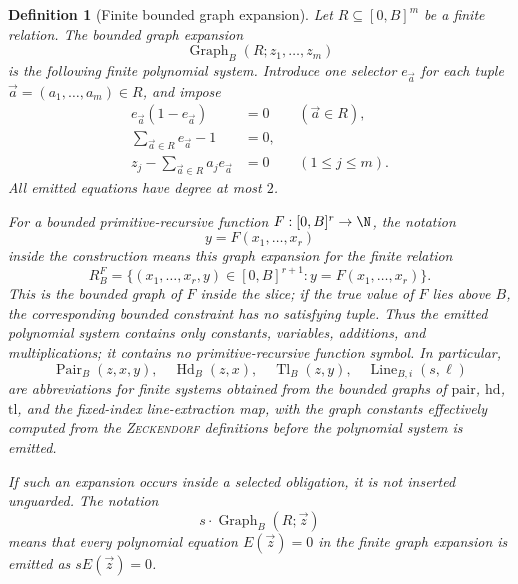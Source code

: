 \documentclass[letterpaper,10pt]{article}
\theoremstyle{upright}
\theoremstyle{upright}
\newtheorem{definition}[theorem]{Definition}
\begin{document}
\begin{definition}[Finite bounded graph expansion]
\label{def:bounded-graph-expansion}
	Let $R\subseteq[0,B]^m$ be a finite relation. The bounded graph expansion
	\begin{equation}
		\operatorname{Graph}_{B}(R;z_1,\ldots,z_m)
	\end{equation}
	is the following finite polynomial system. Introduce one selector $e_{\vec{a}}$ for each tuple $\vec{a}=(a_1,\ldots,a_m)\in R$, and impose
	\begin{align}
		e_{\vec{a}}(1-e_{\vec{a}})&=0 &&(\vec{a}\in R),\\
		\sum_{\vec{a}\in R}e_{\vec{a}}-1&=0,\\
		z_j-\sum_{\vec{a}\in R}a_j e_{\vec{a}}&=0 &&(1\leq j\leq m).
	\end{align}
	All emitted equations have degree at most $2$.

	For a bounded primitive-recursive function $F:[0,B]^r\to\N$, the notation
	\begin{equation}
		y=F(x_1,\ldots,x_r)
	\end{equation}
	inside the construction means this graph expansion for the finite relation
	\begin{equation}
		R^F_B=\{(x_1,\ldots,x_r,y)\in[0,B]^{r+1}: y=F(x_1,\ldots,x_r)\}.
	\end{equation}
	This is the bounded graph of $F$ inside the slice; if the true value of $F$ lies above $B$, the corresponding bounded constraint has no satisfying tuple.
	Thus the emitted polynomial system contains only constants, variables, additions, and multiplications; it contains no primitive-recursive function symbol. In particular,
	\begin{equation}
		\operatorname{Pair}_B(z,x,y),\quad
		\operatorname{Hd}_B(z,x),\quad
		\operatorname{Tl}_B(z,y),\quad
		\operatorname{Line}_{B,i}(s,\ell)
	\end{equation}
	are abbreviations for finite systems obtained from the bounded graphs of $\mathrm{pair}$, $\mathrm{hd}$, $\mathrm{tl}$, and the fixed-index line-extraction map, with the graph constants effectively computed from the \textsc{Zeckendorf} definitions before the polynomial system is emitted.

	If such an expansion occurs inside a selected obligation, it is not inserted unguarded. The notation
	\begin{equation}
		s\cdot\operatorname{Graph}_B(R;\vec{z})
	\end{equation}
	means that every polynomial equation $E(\vec{z})=0$ in the finite graph expansion is emitted as $sE(\vec{z})=0$.
\end{definition}
\end{document}
